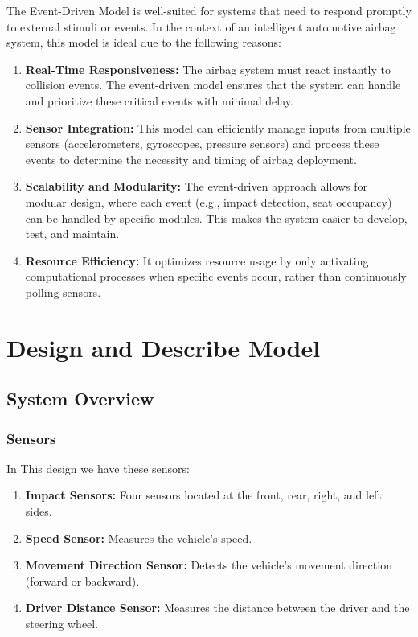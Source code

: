 \documentclass[12pt	]{article}
\begin{document}
The Event-Driven Model is well-suited for systems that need to respond promptly to external stimuli or events. In the context of an intelligent automotive airbag system, this model is ideal due to the following reasons:

\begin{enumerate}
	\item 
	\textbf{Real-Time Responsiveness:} The airbag system must react instantly to collision events. The event-driven model ensures that the system can handle and prioritize these critical events with minimal delay.
	
	\item 
	\textbf{Sensor Integration:} This model can efficiently manage inputs from multiple sensors (accelerometers, gyroscopes, pressure sensors) and process these events to determine the necessity and timing of airbag deployment.
	
	\item 
	\textbf{Scalability and Modularity:} The event-driven approach allows for modular design, where each event (e.g., impact detection, seat occupancy) can be handled by specific modules. This makes the system easier to develop, test, and maintain.
	
	\item 
	\textbf{Resource Efficiency:} It optimizes resource usage by only activating computational processes when specific events occur, rather than continuously polling sensors.
\end{enumerate}







\section{Design and Describe Model}

\subsection{System Overview}


\subsubsection{Sensors}
In This design we have these sensors:
\begin{enumerate}
	\item \textbf{Impact Sensors: }Four sensors located at the front, rear, right, and left sides.
	\item \textbf{Speed Sensor: }Measures the vehicle’s speed.
	\item \textbf{Movement Direction Sensor: }Detects the vehicle’s movement direction (forward or backward).
	\item \textbf{Driver Distance Sensor: }Measures the distance between the driver and the steering wheel.
\end{enumerate}
\end{document}
